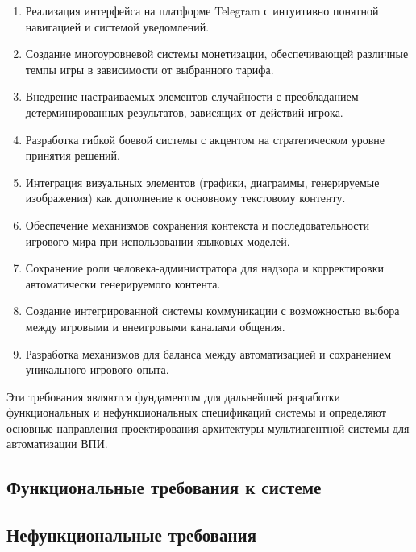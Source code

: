\begin{enumerate}
    \item Реализация интерфейса на платформе Telegram с интуитивно понятной навигацией и системой уведомлений.

    \item Создание многоуровневой системы монетизации, обеспечивающей различные темпы игры в зависимости от выбранного тарифа.

    \item Внедрение настраиваемых элементов случайности с преобладанием детерминированных результатов, зависящих от действий игрока.

    \item Разработка гибкой боевой системы с акцентом на стратегическом уровне принятия решений.

    \item Интеграция визуальных элементов (графики, диаграммы, генерируемые изображения) как дополнение к основному текстовому контенту.

    \item Обеспечение механизмов сохранения контекста и последовательности игрового мира при использовании языковых моделей.

    \item Сохранение роли человека-администратора для надзора и корректировки автоматически генерируемого контента.

    \item Создание интегрированной системы коммуникации с возможностью выбора между игровыми и внеигровыми каналами общения.

    \item Разработка механизмов для баланса между автоматизацией и сохранением уникального игрового опыта.
\end{enumerate}

Эти требования являются фундаментом для дальнейшей разработки функциональных и нефункциональных спецификаций системы и определяют основные направления проектирования архитектуры мультиагентной системы для автоматизации ВПИ.

\subsection{Функциональные требования к системе}

\subsection{Нефункциональные требования}

